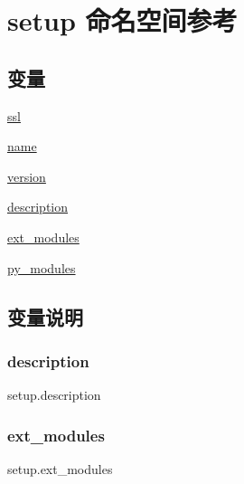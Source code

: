 \hypertarget{namespacesetup}{}\section{setup 命名空间参考}
\label{namespacesetup}
\subsection*{变量}
\begin{DoxyCompactItemize}
\item 
\mbox{\hyperlink{namespacesetup_aba1552ed5b692ceaa22ff156855dfa50}{ssl}}
\item 
\mbox{\hyperlink{namespacesetup_ab3a7a0638d76a01367c5bc3cc699447f}{name}}
\item 
\mbox{\hyperlink{namespacesetup_a2aa722b36a933088812b50ea79b97a5c}{version}}
\item 
\mbox{\hyperlink{namespacesetup_aedf461ec52a946bda975938ba0b93ec0}{description}}
\item 
\mbox{\hyperlink{namespacesetup_a1bf56ea61d1e9865f316116dca2fbfea}{ext\+\_\+modules}}
\item 
\mbox{\hyperlink{namespacesetup_ad6a0f278ba38b7ed3595fd6896196fb3}{py\+\_\+modules}}
\end{DoxyCompactItemize}


\subsection{变量说明}
\mbox{\label{namespacesetup_aedf461ec52a946bda975938ba0b93ec0}} 
\subsubsection{\texorpdfstring{description}{description}}
{\footnotesize\ttfamily setup.\+description}

\mbox{\label{namespacesetup_a1bf56ea61d1e9865f316116dca2fbfea}} 
\subsubsection{\texorpdfstring{ext\+\_\+modules}{ext\_modules}}
{\footnotesize\ttfamily setup.\+ext\+\_\+modules}

